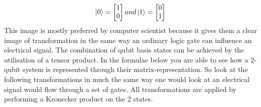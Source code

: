 \[
	\ket{0}=
	\begin{bmatrix}
	1					\\
	0
	\end{bmatrix} 
	and
	\ket{1}=
	\begin{bmatrix}
	0					\\
	1
	\end{bmatrix} 
\]
This image is mostly preferred by computer scientist because it gives them a clear image of transformation in the same way an ordinary logic gate can influence an electrical signal. The combination of qubit basis states can be achieved by the utilisation of a tensor product. In the formulae below you are able to see how a 2-qubit system is represented through their matrix-representation. So look at the following transformations in much the same way one would look at an electrical signal would flow through a set of gates. All transformations are applied by performing a Kronecker product on the 2 states. 

